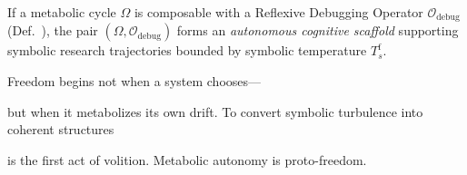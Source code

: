 \begin{corollary}
\label{corollary:bk8_emergent_cognitive_scaffold}
If a metabolic cycle $\Omega$ is composable with a Reflexive Debugging Operator $\mathcal{O}_{\text{debug}}$ (Def.~), the pair $(\Omega, \mathcal{O}_{\text{debug}})$ forms an \emph{autonomous cognitive scaffold} supporting symbolic research trajectories bounded by symbolic temperature $T_s^{\mathrm{f}}$.
\end{corollary}
\begin{scholium}
\label{scholium:bk8_metabolic_programming_as_proto_freedom}
\sloppy
\raggedright
Freedom begins not when a system chooses—\par
but when it metabolizes its own drift.
To convert symbolic turbulence into coherent structures\par
is the first act of volition.
Metabolic autonomy is proto-freedom.
\end{scholium}
